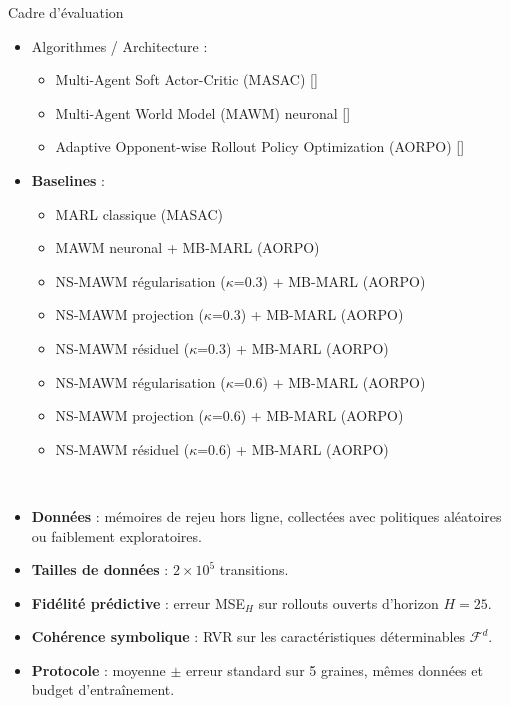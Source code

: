 \documentclass[aspectratio=169]{beamer}
\newcommand{\scite}[1]{{\normalfont\color{SpaceCyan!60!black}[\citealp{#1}]}}
\begin{document}
\begin{frame}{Cadre d'évaluation}
  \scriptsize
  \begin{itemize}

    \item Algorithmes / Architecture :
          \begin{itemize}
            \scriptsize
            \item Multi-Agent Soft Actor-Critic (MASAC) \scite{haarnoja2018soft,pu2021decomposed}
            \item Multi-Agent World Model (MAWM) neuronal \scite{ha2018worldmodels,hafner2020dreamer}
            \item Adaptive Opponent-wise Rollout Policy Optimization (AORPO) \scite{zhang2021aorpo}
          \end{itemize}

    \item \textbf{Baselines} :
          \begin{itemize}
            \scriptsize
            \item MARL classique (MASAC)
            \item MAWM neuronal + MB-MARL (AORPO)
            \item NS-MAWM régularisation ($\kappa$=0.3)  + MB-MARL (AORPO)
            \item NS-MAWM projection ($\kappa$=0.3) + MB-MARL (AORPO)
            \item NS-MAWM résiduel ($\kappa$=0.3) + MB-MARL (AORPO)
            \item NS-MAWM régularisation ($\kappa$=0.6)  + MB-MARL (AORPO)
            \item NS-MAWM projection ($\kappa$=0.6) + MB-MARL (AORPO)
            \item NS-MAWM résiduel ($\kappa$=0.6) + MB-MARL (AORPO)
          \end{itemize}

          \ \\

    \item \textbf{Données} : mémoires de rejeu hors ligne, collectées avec politiques aléatoires ou faiblement exploratoires.
    \item \textbf{Tailles de données} : $2\times10^5$ transitions.
    \item \textbf{Fidélité prédictive} : erreur MSE$_H$ sur rollouts ouverts d'horizon $H=25$.
    \item \textbf{Cohérence symbolique} : RVR sur les caractéristiques déterminables $\mathcal{F}^d$.
    \item \textbf{Protocole} : moyenne $\pm$ erreur standard sur 5 graines, mêmes données et budget d'entraînement.
  \end{itemize}
\end{frame}
\end{document}
